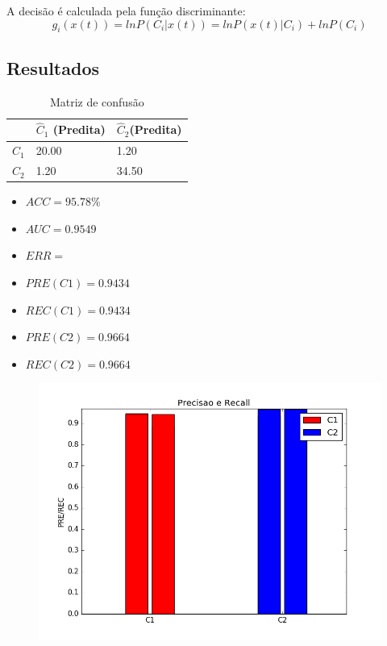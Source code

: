 \documentclass[11pt,a4paper]{article}
\numberwithin{equation}{section}
\begin{document}
A decisão é calculada pela função discriminante:
\[ g_i(x(t))= ln P(C_i|x(t))= ln P(x(t)|C_i)+ ln P(C_i)\]

\subsection{Resultados}

\begin{table}[H]
\centering
\caption{Matriz de confusão}
\begin{tabular}{l l l}
\hline
 & \textbf{$\hat{C}_1$ (Predita)} & \textbf{$\hat{C}_2$(Predita)}\\
\hline
$C_1$ & 20.00&1.20\\ 
$C_2$ &  1.20&34.50\\ 
\hline
\end{tabular}
\end{table}

\begin{minipage}{.5\textwidth}
\begin{itemize}
\item $ACC = 95.78 \%$
\item $AUC = 0.9549 $
\item $ERR =  $
\item $PRE(C1) = 0.9434$
\item $REC(C1) = 0.9434$
\item $PRE(C2) = 0.9664$
\item $REC(C2) = 0.9664$
\end{itemize}
\end{minipage}%
\begin{minipage}{.5\textwidth}
\begin{figure}[H]
\centering
  \includegraphics[width=\linewidth]{../img/quad_bayes_rec.png}
  \label{fig:percep}
\end{figure}
\end{minipage}%
\end{document}
